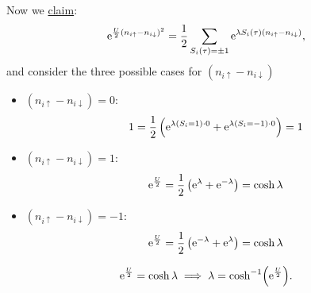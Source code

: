Now we \underline{claim}:
\begin{equation*}
\mathrm{e}^{\frac{U}{2}(n_{i\uparrow}-n_{i\downarrow})^2} = \frac12\sum_{S_i(\tau)=\pm 1}\mathrm{e}^{\lambda S_i(\tau)(n_{i\uparrow}-n_{i\downarrow})},
\end{equation*}
and consider the three possible cases for \((n_{i\uparrow}-n_{i\downarrow})\)
\begin{itemize}
\item \((n_{i\uparrow}-n_{i\downarrow}) = 0\): \begin{equation*}
1 = \frac{1}{2}\left(\mathrm{e}^{\lambda(S_i = 1)\cdot 0} + \mathrm{e}^{\lambda(S_i=-1)\cdot 0}\right) = 1
\end{equation*}
\item \((n_{i\uparrow}-n_{i\downarrow}) = 1\): 
\begin{equation*}
\mathrm{e}^{\frac{U}{2}} = \frac12\left(\mathrm{e}^\lambda + \mathrm{e}^{-\lambda}\right) = \cosh\lambda
\end{equation*}
\item \((n_{i\uparrow}-n_{i\downarrow}) = -1\): 
\begin{equation*}
\mathrm{e}^{\frac{U}{2}} = \frac12\left(\mathrm{e}^{-\lambda}+\mathrm{e}^\lambda \right) = \cosh\lambda
\end{equation*}
\end{itemize}
\begin{equation}
\mathrm{e}^{\frac{U}{2}} = \cosh\lambda \implies\lambda=\cosh[-1](\mathrm{e}^{\frac{U}{2}}).
\end{equation}

